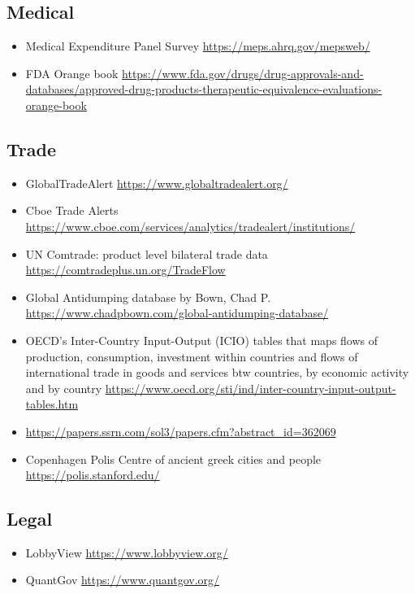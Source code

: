 \documentclass[10pt]{article} %
\begin{document}
    \subsection{Medical}
        \begin{itemize}
            \item Medical Expenditure Panel Survey \url{https://meps.ahrq.gov/mepsweb/}
            \item FDA Orange book \url{https://www.fda.gov/drugs/drug-approvals-and-databases/approved-drug-products-therapeutic-equivalence-evaluations-orange-book}
        \end{itemize}

    \subsection{Trade}
        \begin{itemize}
            \item GlobalTradeAlert \url{https://www.globaltradealert.org/}
            \item Cboe Trade Alerts \url{https://www.cboe.com/services/analytics/tradealert/institutions/}
            \item UN Comtrade: product level bilateral trade data \url{https://comtradeplus.un.org/TradeFlow}
            \item Global Antidumping database by Bown, Chad P. \url{https://www.chadpbown.com/global-antidumping-database/}
            \item OECD's Inter-Country Input-Output (ICIO) tables that maps flows of production, consumption, investment within countries and flows of international trade in goods and services btw countries, by economic activity and by country \url{https://www.oecd.org/sti/ind/inter-country-input-output-tables.htm}
            \item \cite{FeenstraRomalisSchott2002} \url{https://papers.ssrn.com/sol3/papers.cfm?abstract_id=362069}
            \item Copenhagen Polis Centre of ancient greek cities and people \url{https://polis.stanford.edu/}
        \end{itemize}

    \subsection{Legal}
        \begin{itemize}
        \item LobbyView \url{https://www.lobbyview.org/}
        \item QuantGov \url{https://www.quantgov.org/}
        \end{itemize}
    
\end{document}
